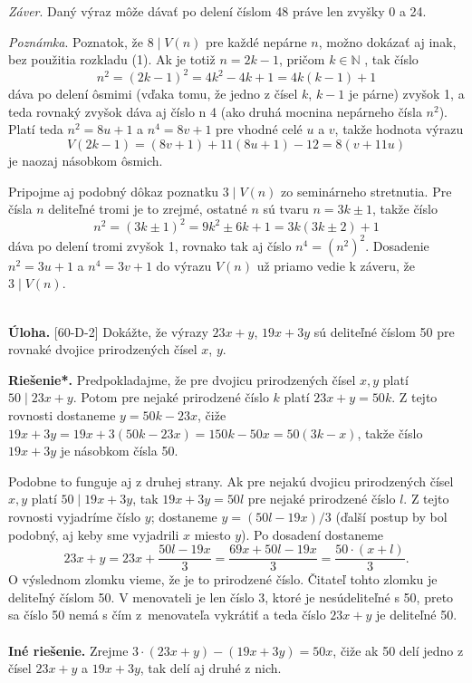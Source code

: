 \documentclass[11pt,a4paper,oneside,final]{book}
\newcommand{\NN}{\mathbb{N}}
\newcommand{\ul}{\textbf{Úloha.} }
\newcommand{\rieh}{\textbf{Riešenie*.} }
\begin{document}
\textit{Záver}. Daný výraz môže dávať po delení číslom 48 práve len zvyšky 0 a 24.

\textit{Poznámka}. Poznatok, že $8 \mid V (n)$ pre každé nepárne $n$, možno dokázať aj inak, bez použitia rozkladu (1). Ak je totiž $n = 2k - 1$, pričom $k \in \NN$ , tak číslo
$$n^2= (2k - 1)^2= 4k^2 - 4k + 1 = 4k(k - 1) + 1$$
dáva po delení ôsmimi (vďaka tomu, že jedno z čísel $k$, $k - 1$ je párne) zvyšok 1, a teda rovnaký zvyšok dáva aj číslo n 4 (ako druhá mocnina nepárneho čísla $n^2$). Platí teda $n^2 = 8u + 1$ a $n^4 = 8v + 1$ pre vhodné celé $u$ a $v$, takže hodnota výrazu
$$V (2k - 1) = (8v + 1) + 11(8u + 1) - 12 = 8(v + 11u)$$
je naozaj násobkom ôsmich.

Pripojme aj podobný dôkaz poznatku $3 \mid V (n)$ zo seminárneho stretnutia. Pre čísla $n$ deliteľné tromi je to zrejmé, ostatné $n$ sú tvaru $n = 3k \pm 1$, takže číslo
$$n^2= (3k \pm 1)^2= 9k^2 \pm 6k + 1 = 3k(3k \pm 2) + 1$$
dáva po delení tromi zvyšok 1, rovnako tak aj číslo $n^4 = (n^2)^2$. Dosadenie $n^2 = 3u + 1$ a $n^4 = 3v + 1$ do výrazu $V (n)$ už priamo vedie k záveru, že $3 \mid V (n)$.\\
\\
\begin{tcolorbox}[breakable,notitle,boxrule=0pt,colback=light-gray,colframe=light-gray]\ul [60-D-2]
Dokážte, že výrazy $23x + y$, $19x + 3y$ sú deliteľné číslom 50 pre rovnaké dvojice prirodzených čísel $x$, $y$.

\end{tcolorbox}

\rieh Predpokladajme, že pre dvojicu prirodzených čísel $x, y$ platí $50 \mid 23x + y$. Potom pre nejaké prirodzené číslo $k$ platí $23x + y = 50k$. Z tejto rovnosti dostaneme $y = 50k - 23x$, čiže $19x + 3y = 19x + 3(50k - 23x) = 150k - 50x = 50(3k - x)$, takže číslo $19x + 3y$ je násobkom čísla 50.

Podobne to funguje aj z druhej strany. Ak pre nejakú dvojicu prirodzených čísel $x,y$ platí $50 \mid 19x + 3y$, tak $19x + 3y = 50l$ pre nejaké prirodzené číslo $l$. Z tejto rovnosti vyjadríme číslo $y$; dostaneme $y = (50l - 19x)/3$ (ďalší postup by bol podobný, aj keby sme vyjadrili $x$ miesto $y$). Po dosadení dostaneme $$23x + y = 23x + \frac{50l - 19x}{3}=\frac{69x + 50l - 19x}{3}=\frac{50 \cdot (x + l)}{3}.$$
O výslednom zlomku vieme, že je to prirodzené číslo. Čitateľ tohto zlomku je deliteľný číslom 50. V menovateli je len číslo 3, ktoré je nesúdeliteľné s 50, preto sa číslo 50 nemá s čím z~menovateľa vykrátiť a teda číslo $23x + y$ je deliteľné 50.\\
\\
\textbf{Iné riešenie.} Zrejme $3 \cdot (23x + y) - (19x + 3y) = 50x$, čiže ak 50 delí jedno z čísel $23x + y$ a $19x + 3y$, tak delí aj druhé z nich.\\
\end{document}

